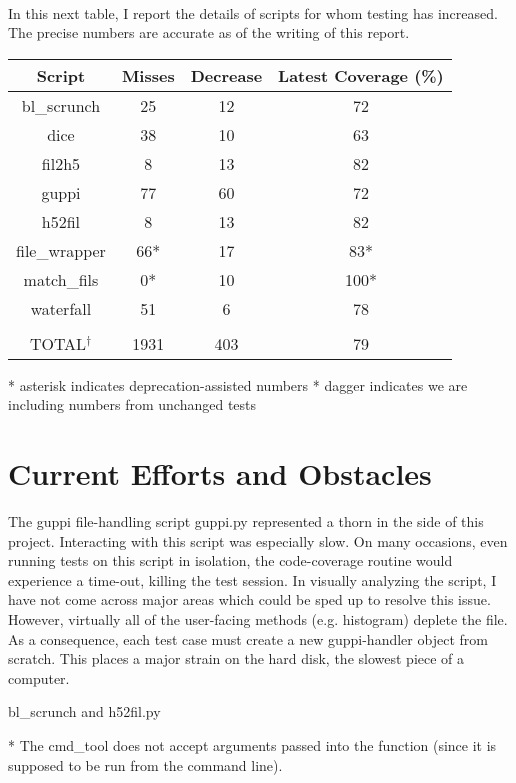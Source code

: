 \documentclass[12pt]{article}
\begin{document}
\begin{center}
\

In this next table, I report the details of scripts for whom testing has increased. The precise numbers are accurate as of the writing of this report.

 \begin{tabular}{||c c c c||} 
 \hline
 Script & Misses & Decrease & Latest Coverage (\%)\\ [0.5ex] 
\hline
bl\_scrunch & 25 & 12 & 72 \\
\hline
dice & 38 & 10 & 63 \\
\hline
fil2h5 & 8 & 13 & 82 \\
\hline
guppi & 77 & 60 & 72 \\
\hline
h52fil & 8 & 13 & 82 \\
\hline
file\_wrapper & 66* & 17 & 83* \\
\hline
match\_fils & 0* & 10 & 100* \\
\hline
waterfall & 51 & 6 & 78 \\
\hline
&&&
\\
\hline
TOTAL$^\dagger$ & 1931 & 403 & 79 \\ [1ex] 
\hline
\end{tabular}
\end{center}

* asterisk indicates deprecation-assisted numbers
* dagger indicates we are including numbers from unchanged tests

\section{Current Efforts and Obstacles}

\quad \quad The guppi file-handling script guppi.py represented a thorn in the side of this project. Interacting with this script was especially slow. On many occasions, even running tests on this script in isolation, the code-coverage routine would experience a time-out, killing the test session. In visually analyzing the script, I have not come across major areas which could be sped up to resolve this issue. However, virtually all of the user-facing methods (e.g. histogram) deplete the file. As a consequence, each test case must create a new guppi-handler object from scratch. This places a major strain on the hard disk, the slowest piece of a computer.

bl\_scrunch and h52fil.py
    
		* The cmd\_tool does not accept arguments passed into the function (since it is supposed to be run from the command line).
		
\end{document}
